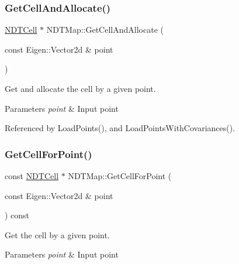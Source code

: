 \mbox{\label{classNDTMap_ab37c2e140bf7b138be3cd0b4d5104dfc}} 
\subsubsection{\texorpdfstring{Get\+Cell\+And\+Allocate()}{GetCellAndAllocate()}}
{\footnotesize\ttfamily \hyperlink{classNDTCell}{N\+D\+T\+Cell} $\ast$ N\+D\+T\+Map\+::\+Get\+Cell\+And\+Allocate (\begin{DoxyParamCaption}\item[{const Eigen\+::\+Vector2d \&}]{point }\end{DoxyParamCaption})}



Get and allocate the cell by a given point. 


\begin{DoxyParams}{Parameters}
{\em point} & Input point \\
\hline
\end{DoxyParams}


Referenced by Load\+Points(), and Load\+Points\+With\+Covariances().

\mbox{\label{classNDTMap_aa8c796e4bf0512e4d640887d228b2404}} 
\subsubsection{\texorpdfstring{Get\+Cell\+For\+Point()}{GetCellForPoint()}}
{\footnotesize\ttfamily const \hyperlink{classNDTCell}{N\+D\+T\+Cell} $\ast$ N\+D\+T\+Map\+::\+Get\+Cell\+For\+Point (\begin{DoxyParamCaption}\item[{const Eigen\+::\+Vector2d \&}]{point }\end{DoxyParamCaption}) const}



Get the cell by a given point. 


\begin{DoxyParams}{Parameters}
{\em point} & Input point \\
\hline
\end{DoxyParams}


